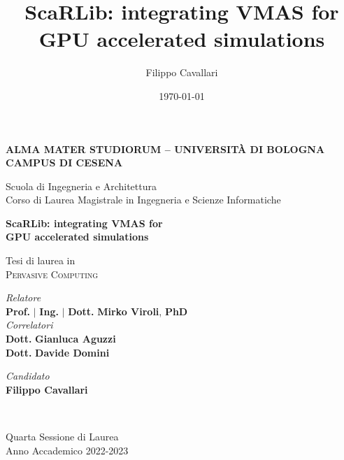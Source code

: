 \title{ScaRLib: integrating VMAS for GPU accelerated simulations}
\author{Filippo Cavallari}
\date{\today}

\begin{titlepage}
	\begin{center}
		
		\large
		\textbf{ALMA MATER STUDIORUM -- UNIVERSITÀ DI BOLOGNA \\ CAMPUS DI CESENA}
		\\
		\noindent\hrulefill
		\vspace{0.4cm}
		
		\Large
		Scuola di Ingegneria e Architettura \\
		Corso di Laurea Magistrale in Ingegneria e Scienze Informatiche
		
		\Huge
		\vspace{4cm}
		\textbf{
			ScaRLib: integrating VMAS for 
			\\
			GPU accelerated simulations
		}
		
		\large
		\vspace{1cm}
		Tesi di laurea in 
		\\
		\textsc{Pervasive Computing}
		
		\vspace{5.5cm}
		\begin{minipage}[t]{0.64\textwidth}
			\begin{flushleft}
				\textit{Relatore} 
				\\ 
				\textbf{Prof.} $\mid$ \textbf{Ing.} $\mid$ \textbf{Dott.} \textbf{Mirko Viroli}, \textbf{PhD}
				\\
				\vspace{0.4cm}
				\textit{Correlatori} 
				\\
				\textbf{Dott.} \textbf{Gianluca Aguzzi}
				\\
				\textbf{Dott.} \textbf{Davide Domini}
			\end{flushleft}
		\end{minipage}
		\begin{minipage}[t]{0.34\textwidth}
			\begin{flushright}
				\textit{Candidato} 
				\\ 
				\textbf{Filippo Cavallari}
			\end{flushright}
		\end{minipage}\\
		
		\vfill
		\noindent\hrulefill
		\vspace{0.3cm}
		\Large
		
		Quarta Sessione di Laurea
		\\
		Anno Accademico 2022-2023
	\end{center}
\end{titlepage}
\restoregeometry
